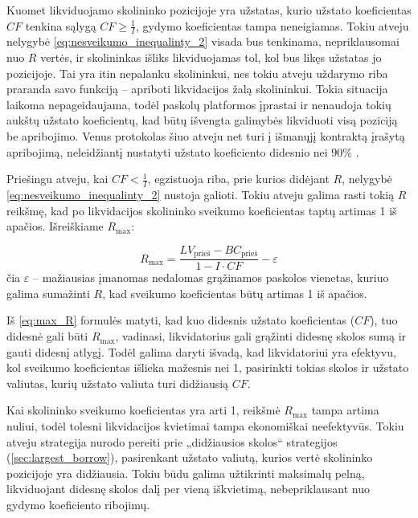 \documentclass[]{VUMIFTemplateClass}
\begin{document}
Kuomet likviduojamo skolininko pozicijoje yra užstatas, kurio užstato koeficientas $CF$ tenkina sąlygą $CF \geq \frac{1}{I}$, gydymo koeficientas tampa neneigiamas. Tokiu atveju nelygybė \ref{eq:nesveikumo_inequalinty_2} visada bus tenkinama, nepriklausomai nuo $R$ vertės, ir skolininkas išliks likviduojamas tol, kol bus likęs užstatas jo pozicijoje. Tai yra itin nepalanku skolininkui, nes tokiu atveju uždarymo riba praranda savo funkciją – apriboti likvidacijos žalą skolininkui. Tokia situacija laikoma nepageidaujama, todėl paskolų platformos įprastai ir nenaudoja tokių aukštų užstato koeficientų, kad būtų išvengta galimybės likviduoti visą poziciją be apribojimo.  Venus protokolas šiuo atveju net turi į išmanųjį kontraktą įrašytą apribojimą, neleidžiantį nustatyti užstato koeficiento didesnio nei 90\% \cite{venusmaxcf}.

Priešingu atveju, kai $CF < \frac{1}{I}$, egzistuoja riba, prie kurios didėjant $R$, nelygybė \ref{eq:nesveikumo_inequalinty_2} nustoja galioti. Tokiu atveju galima rasti tokią $R$ reikšmę, kad po likvidacijos skolininko sveikumo koeficientas taptų artimas 1 iš apačios. 
Išreiškiame $R_{\text{max}}$:

\begin{equation}
    R_{\text{max}} = \frac{LV_{\text{prieš}} - BC_{\text{prieš}}}{1 - I \cdot CF} - \varepsilon
    \label{eq:max_R}
\end{equation}
čia $\varepsilon$ – mažiausias įmanomas nedalomas grąžinamos paskolos vienetas, kuriuo galima sumažinti $R$, kad sveikumo koeficientas būtų artimas 1 iš apačios.

Iš \ref{eq:max_R} formulės matyti, kad kuo didesnis užstato koeficientas ($CF$), tuo didesnė gali būti $R_{\text{max}}$, vadinasi, likvidatorius gali grąžinti didesnę skolos sumą ir gauti didesnį atlygį. Todėl galima daryti išvadą, kad likvidatoriui yra efektyvu, kol sveikumo koeficientas išlieka mažesnis nei 1, pasirinkti tokias skolos ir užstato valiutas, kurių užstato valiuta turi didžiausią $CF$.

Kai skolininko sveikumo koeficientas yra arti 1, reikšmė $R_{\text{max}}$ tampa artima nuliui, todėl tolesni likvidacijos kvietimai tampa ekonomiškai neefektyvūs. Tokiu atveju strategija nurodo pereiti prie „didžiausios skolos“ strategijos (\ref{sec:largest_borrow}), pasirenkant užstato valiutą, kurios vertė skolininko pozicijoje yra didžiausia. Tokiu būdu galima užtikrinti maksimalų pelną, likviduojant didesnę skolos dalį per vieną iškvietimą, nebepriklausant nuo gydymo koeficiento ribojimų.
\end{document}
